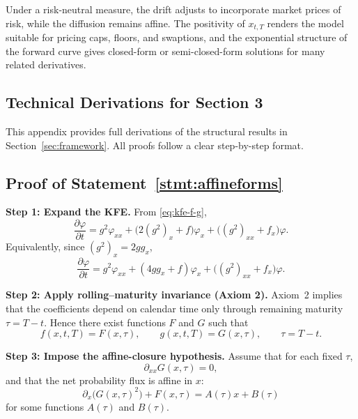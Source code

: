 \documentclass[12pt]{article}
\theoremstyle{statementstyle}
\begin{document}
Under a risk-neutral measure, the drift adjusts to incorporate market 
prices of risk, while the diffusion remains affine. The positivity of 
$x_{t,T}$ renders the model suitable for pricing caps, floors, and 
swaptions, and the exponential structure of the forward curve gives 
closed-form or semi-closed-form solutions for many related derivatives.
\begin{appendices}
\section{Technical Derivations for Section 3}
\label{appendix:A}

This appendix provides full derivations of the structural results in
Section~\ref{sec:framework}. All proofs follow a clear step-by-step
format.

\subsection{Proof of Statement~\ref{stmt:affineforms}}
\label{appendix:A1}
\medskip
\noindent\textbf{Step 1: Expand the KFE.}  
From \eqref{eq:kfe-f-g},
\begin{equation}
\frac{\partial\varphi}{\partial t}
=
g^{2}\varphi_{xx}
+
\bigl(2(g^{2})_{x}+f\bigr)\varphi_{x}
+
\bigl((g^{2})_{xx}+f_{x}\bigr)\varphi.
\tag{A.1.1}
\end{equation}
Equivalently, since \((g^{2})_{x}=2g g_{x}\),
\[
\frac{\partial\varphi}{\partial t}
=
g^{2}\varphi_{xx}
+
(4g g_{x}+f)\varphi_{x}
+
\bigl((g^{2})_{xx}+f_{x}\bigr)\varphi.
\]

\medskip
\noindent\textbf{Step 2: Apply rolling--maturity invariance (Axiom 2).}  
Axiom~2 implies that the coefficients depend on calendar time only through
remaining maturity \(\tau=T-t\). Hence there exist functions \(F\) and
\(G\) such that
\begin{equation}
f(x,t,T)=F(x,\tau),
\qquad
g(x,t,T)=G(x,\tau),
\qquad \tau=T-t.
\tag{A.1.2}
\end{equation}

\medskip
\noindent\textbf{Step 3: Impose the affine-closure hypothesis.}  
Assume that for each fixed \(\tau\),
\begin{equation}
\partial_{xx}G(x,\tau)=0,
\tag{A.1.3}\label{eq:A13}
\end{equation}
and that the net probability flux is affine in \(x\):
\begin{equation}
\partial_x\!\bigl(G(x,\tau)^2\bigr)+F(x,\tau)=A(\tau)x+B(\tau)
\tag{A.1.4}\label{eq:A14}
\end{equation}
for some functions \(A(\tau)\) and \(B(\tau)\).


\end{appendices}
\end{document}
